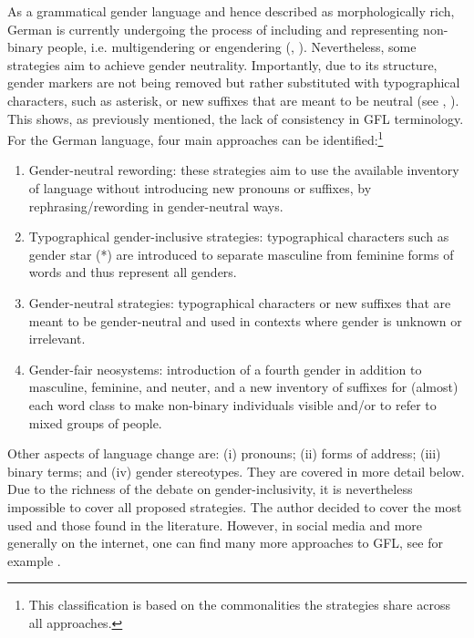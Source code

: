 As a grammatical gender language and hence described as morphologically rich, German is currently undergoing the process of including and representing non-binary people, i.e. multigendering or engendering (\cite[17]{weatherall2002gender}, \cite{sczesny2016can}). Nevertheless, some strategies aim to achieve gender neutrality. Importantly, due to its structure, gender markers are not being removed but rather substituted with typographical characters, such as asterisk, or new suffixes that are meant to be neutral (see \cite[294]{hornscheidt2012feministische}, \cite[53]{hornscheidt2021wie}). This shows, as previously mentioned, the lack of consistency in GFL terminology. For the German language, four main approaches can be identified:\footnote{This classification is based on the commonalities the strategies share across all approaches.}
\begin{enumerate}
\setlength\itemsep{-0.5em}
    \item Gender-neutral rewording: these strategies aim to use the available inventory of language without introducing new pronouns or suffixes, by rephrasing/rewording in gender-neutral ways.
    \item Typographical gender-inclusive strategies: typographical characters such as gender star (*) are introduced to separate masculine from feminine forms of words and thus represent all genders.
    \item Gender-neutral strategies: typographical characters or new suffixes that are meant to be gender-neutral and used in contexts where gender is unknown or irrelevant.
    \item Gender-fair neosystems: introduction of a fourth gender in addition to masculine, feminine, and neuter, and a new inventory of suffixes for (almost) each word class to make non-binary individuals visible and/or to refer to mixed groups of people. 
\end{enumerate}
Other aspects of language change are: (i) pronouns; (ii) forms of address; (iii) binary terms; and (iv) gender stereotypes. They are covered in more detail below. Due to the richness of the debate on gender-inclusivity, it is nevertheless impossible to cover all proposed strategies. The author decided to cover the most used and those found in the literature. However, in social media and more generally on the internet, one can find many more approaches to GFL, see for example \textcite{nibispace}.

